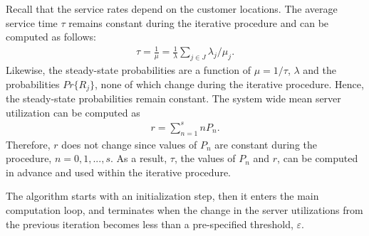 \documentclass[11pt]{article}\topmargin 0mm
\begin{document}

Recall that the service rates depend on the customer locations.
The average service time $\tau$ remains constant during the
iterative procedure and can be computed as follows:
\begin{equation}
\label{eq:tau}
\begin{split}
\tau = \frac{1}{\mu} = \frac{1}{\lambda} \sum_{j\in J} \lambda_j / \mu_j.
\end{split}
\end{equation}
Likewise, the steady-state probabilities are a function of $\mu
= 1/\tau$, $\lambda$ and the probabilities $Pr\{R_j\}$, none of
which change during the iterative procedure. Hence, the
steady-state probabilities remain constant. The system wide
mean server utilization can be computed as
\begin{equation}
\label{eq:utilization}
\begin{split}
r = \sum_{n=1}^{s} nP_n.
\end{split}
\end{equation}
Therefore, $r$ does not change since values of $P_n$ are
constant during the procedure, $n=0,1,...,s$. As a result,
$\tau$, the values of $P_n$ and $r$, can be computed in advance
and used within the iterative procedure.

The algorithm starts with an initialization step, then it
enters the main computation loop, and terminates when the
change in the server utilizations from the previous iteration
becomes less than a pre-specified threshold, $\varepsilon$.
\end{document}
